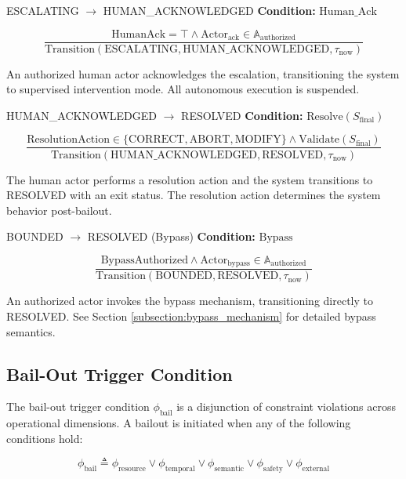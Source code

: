 \begin{transitionfn}{ESCALATING $\rightarrow$ HUMAN\_ACKNOWLEDGED}
\textbf{Condition:} $\text{Human\_Ack}$

\[
\frac{\text{HumanAck} = \top \land \text{Actor}_{\text{ack}} \in \mathbb{A}_{\text{authorized}}}{\text{Transition}(\text{ESCALATING}, \text{HUMAN\_ACKNOWLEDGED}, \tau_{\text{now}})}
\]

An authorized human actor acknowledges the escalation, transitioning the system to supervised intervention mode. All autonomous execution is suspended.
\end{transitionfn}

\begin{transitionfn}{HUMAN\_ACKNOWLEDGED $\rightarrow$ RESOLVED}
\textbf{Condition:} $\text{Resolve}(S_{\text{final}})$

\[
\frac{\text{ResolutionAction} \in \{\text{CORRECT}, \text{ABORT}, \text{MODIFY}\} \land \text{Validate}(S_{\text{final}})}{\text{Transition}(\text{HUMAN\_ACKNOWLEDGED}, \text{RESOLVED}, \tau_{\text{now}})}
\]

The human actor performs a resolution action and the system transitions to RESOLVED with an exit status. The resolution action determines the system behavior post-bailout.
\end{transitionfn}

\begin{transitionfn}{BOUNDED $\rightarrow$ RESOLVED (Bypass)}
\textbf{Condition:} $\text{Bypass}$

\[
\frac{\text{BypassAuthorized} \land \text{Actor}_{\text{bypass}} \in \mathbb{A}_{\text{authorized}}}{\text{Transition}(\text{BOUNDED}, \text{RESOLVED}, \tau_{\text{now}})}
\]

An authorized actor invokes the bypass mechanism, transitioning directly to RESOLVED. See Section \ref{subsection:bypass_mechanism} for detailed bypass semantics.
\end{transitionfn}

\subsection{Bail-Out Trigger Condition}

The bail-out trigger condition $\phi_{\text{bail}}$ is a disjunction of constraint violations across operational dimensions. A bailout is initiated when any of the following conditions hold:

\[
\phi_{\text{bail}} \triangleq \phi_{\text{resource}} \lor \phi_{\text{temporal}} \lor \phi_{\text{semantic}} \lor \phi_{\text{safety}} \lor \phi_{\text{external}}
\]

